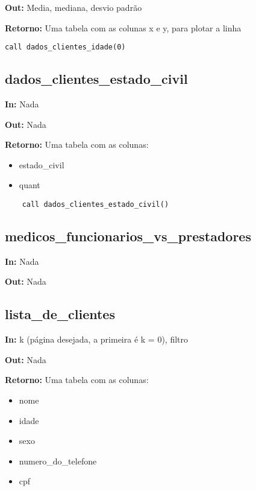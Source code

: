 \textbf{Out:} Media, mediana, desvio padrão

\textbf{Retorno:} Uma tabela com as colunas x e y, para plotar a linha

\begin{verbatim}
call dados_clientes_idade(0)
\end{verbatim}

\subsection{dados\_clientes\_estado\_civil}


\textbf{In:} Nada

\textbf{Out:} Nada

\textbf{Retorno:} Uma tabela com as colunas:

\begin{itemize}
	\item estado\_civil
	\item quant
\end{itemize}

\begin{verbatim}
	call dados_clientes_estado_civil()
\end{verbatim}





\subsection{medicos\_funcionarios\_vs\_prestadores}

\textbf{In:} Nada

\textbf{Out:} Nada\subsection{lista\_de\_clientes}

\textbf{In:} k (página desejada, a primeira é k = 0), filtro

\textbf{Out:} Nada

\textbf{Retorno:} Uma tabela com as colunas:

\begin{itemize}
	\item nome
	\item idade
	\item sexo
	\item numero\_do\_telefone
	\item cpf
\end{itemize}

